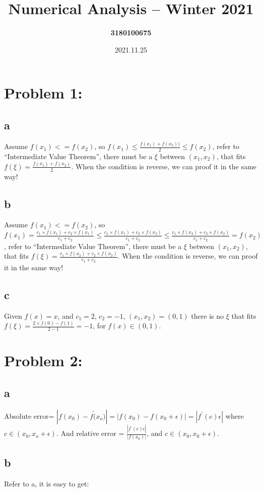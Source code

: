 \documentclass{article}
\title{\textbf{Numerical Analysis – Winter 2021}}
\author{\textbf{3180100675}}
\date{2021.11.25}
\begin{document}
\maketitle

\section{Problem 1:}  

\subsection{a}
Assume $f(x_1)<=f(x_2)$, so $f(x_1)\le \frac{f(x_1)+f(x_2))}{2}\le f(x_2)$, refer to “Intermediate Value Theorem”, there must be a $\xi$ between $(x_1,x_2)$, that fits $f(\xi)=\frac{f(x_1)+f(x_2)}{2}$. When the condition is reverse, we can proof it in the same way!

\subsection{b}
Assume $f(x_1)<=f(x_2)$, so $f(x_1)=\frac{c_1\times f(x_1)+c_2\times f(x_1)}{c_1+c_2}\le \frac{c_1\times f(x_1)+c_2\times f(x_2)}{c_1+c_2}\le \frac{c_1\times f(x_2)+c_2\times f(x_2)}{c_1+c_2}=f(x_2)$, refer to “Intermediate Value Theorem”, there must be a $\xi$ between $(x_1,x_2)$, that fits $f(\xi)=\frac{c_1\times f(x_2)+c_2\times f(x_2)}{c_1+c_2}$. When the condition is reverse, we can proof it in the same way!

\subsection{c}
Given $f(x)=x$, and $c_1=2$, $c_2=-1$, $(x_1,x_2)=(0,1)$ there is no $\xi$ that fits $f(\xi)=\frac{2\times f(0)-f(1)}{2-1}=-1$, for $f(x)\in (0,1)$.

\section{Problem 2:}
\subsection{a}
Absolute error= $|f(x_0)-f\tilde(x_o)|=|f(x_0)-f(x_0+\epsilon)|=|f^{'}(c)\epsilon|$ where $c\in (x_0,x_o+\epsilon)$.
And relative error = $\frac{|f^{'}(c)\epsilon|}{|f(x_0)|}$, and $c\in (x_0,x_0+\epsilon)$.

\subsection{b}
Refer to a, it is easy to get:
\end{document}
